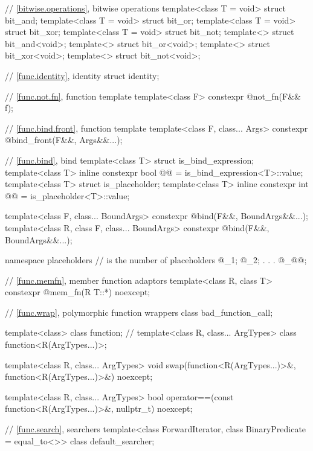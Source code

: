 \begin{codeblock}
{  // \ref{bitwise.operations}, bitwise operations
  template<class T = void> struct bit_and;
  template<class T = void> struct bit_or;
  template<class T = void> struct bit_xor;
  template<class T = void> struct bit_not;
  template<> struct bit_and<void>;
  template<> struct bit_or<void>;
  template<> struct bit_xor<void>;
  template<> struct bit_not<void>;

  // \ref{func.identity}, identity
  struct identity;

  // \ref{func.not.fn}, function template 
  template<class F> constexpr @\unspec@ not_fn(F&& f);

  // \ref{func.bind.front}, function template 
  template<class F, class... Args> constexpr @\unspec@ bind_front(F&&, Args&&...);

  // \ref{func.bind}, bind
  template<class T> struct is_bind_expression;
  template<class T>
    inline constexpr bool @@ = is_bind_expression<T>::value;
  template<class T> struct is_placeholder;
  template<class T>
    inline constexpr int @@ = is_placeholder<T>::value;

  template<class F, class... BoundArgs>
    constexpr @\unspec@ bind(F&&, BoundArgs&&...);
  template<class R, class F, class... BoundArgs>
    constexpr @\unspec@ bind(F&&, BoundArgs&&...);

  namespace placeholders {
    //  is the  number of placeholders
    @\seebelownc@ _1;
    @\seebelownc@ _2;
               .
               .
               .
    @\seebelownc@ _@@;
  }

  // \ref{func.memfn}, member function adaptors
  template<class R, class T>
    constexpr @\unspec@ mem_fn(R T::*) noexcept;

  // \ref{func.wrap}, polymorphic function wrappers
  class bad_function_call;

  template<class> class function;       // \notdef
  template<class R, class... ArgTypes> class function<R(ArgTypes...)>;

  template<class R, class... ArgTypes>
    void swap(function<R(ArgTypes...)>&, function<R(ArgTypes...)>&) noexcept;

  template<class R, class... ArgTypes>
    bool operator==(const function<R(ArgTypes...)>&, nullptr_t) noexcept;

  // \ref{func.search}, searchers
  template<class ForwardIterator, class BinaryPredicate = equal_to<>>
    class default_searcher;

}
\end{codeblock}
